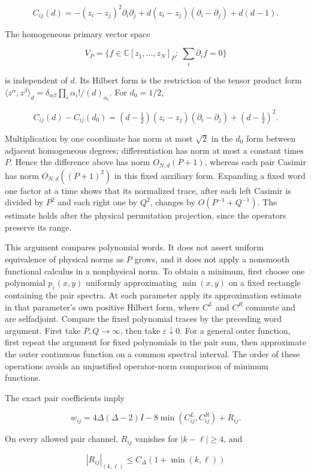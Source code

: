 \documentclass[a4paper,11pt]{article}
\numberwithin{equation}{section}
\begin{document}
\[
C_{ij}(d)=-(z_i-z_j)^2\partial_i\partial_j
+d(z_i-z_j)(\partial_i-\partial_j)+d(d-1).
\]

The homogeneous primary vector space

\[
V_P=\{f\in\mathbb C[z_1,\ldots,z_N]_P:\ \sum_i\partial_i f=0\}
\]

is independent of \(d\). Its Hilbert form is the restriction of the tensor product form \(\langle z^\alpha,z^\beta\rangle_d=\delta_{\alpha\beta}\prod_i\alpha_i!/(d)_{\alpha_i}\). For \(d_0=1/2\),

\[
C_{ij}(d)-C_{ij}(d_0)
=(d-\tfrac12)(z_i-z_j)(\partial_i-\partial_j)+(d-\tfrac12)^2.
\]

Multiplication by one coordinate has norm at most \(\sqrt2\) in the \(d_0\) form between adjacent homogeneous degrees; differentiation has norm at most a constant times \(P\). Hence the difference above has norm \(O_{N,d}(P+1)\), whereas each pair Casimir has norm \(O_{N,d}((P+1)^2)\) in this fixed auxiliary form. Expanding a fixed word one factor at a time shows that its normalized trace, after each left Casimir is divided by \(P^2\) and each right one by \(Q^2\), changes by \(O(P^{-1}+Q^{-1})\). The estimate holds after the physical permutation projection, since the operators preserve its range.

This argument compares polynomial words. It does not assert uniform equivalence of physical norms as \(P\) grows, and it does not apply a nonsmooth functional calculus in a nonphysical norm. To obtain a minimum, first choose one polynomial \(p_\varepsilon(x,y)\) uniformly approximating \(\min(x,y)\) on a fixed rectangle containing the pair spectra. At each parameter apply its approximation estimate in that parameter's own positive Hilbert form, where \(C^L\) and \(C^R\) commute and are selfadjoint. Compare the fixed polynomial traces by the preceding word argument. First take \(P,Q\to\infty\), then take \(\varepsilon\downarrow0\). For a general outer function, first repeat the argument for fixed polynomials in the pair sum, then approximate the outer continuous function on a common spectral interval. The order of these operations avoids an unjustified operator-norm comparison of minimum functions.

The exact pair coefficients imply

\[
w_{ij}=4\Delta(\Delta-2)I
-8\min(C_{ij}^L,C_{ij}^R)+R_{ij}.
\]

On every allowed pair channel, \(R_{ij}\) vanishes for \(|k-\ell|\geq4\), and

\[
|R_{ij}|_{(k,\ell)}\leq C_\Delta(1+\min(k,\ell))
\]
\end{document}
